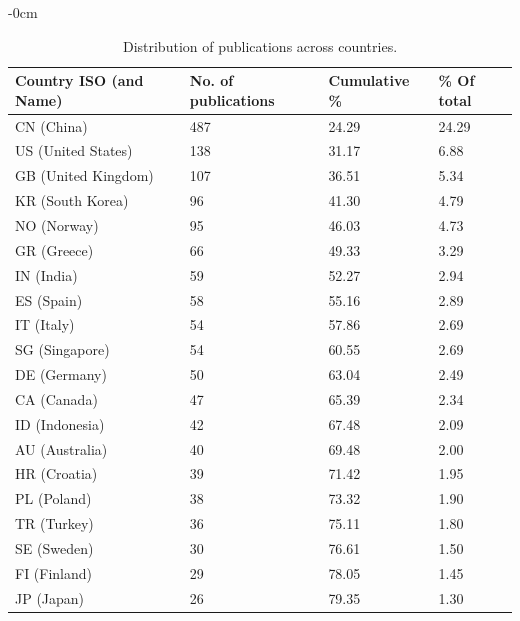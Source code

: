 \documentclass[jmse,review,submit,pdftex,moreauthors]{Definitions/mdpi}
\begin{document}
\begin{adjustwidth}{-\extralength}{0cm}
\begin{table}[H]
	\centering
	\caption{Distribution of publications across countries. }
	\begin{tabularx}{\linewidth}{XXXX}
		\hline
		Country ISO (and Name) & No. of publications & Cumulative \% & \% Of total \\
		\hline
		CN (China) & 487 & 24.29 & 24.29\\
		US (United States) & 138 & 31.17 & 6.88\\
		GB (United Kingdom) & 107 & 36.51 & 5.34\\
		KR (South Korea) & 96 & 41.30 & 4.79\\
		NO (Norway) & 95 & 46.03 & 4.73\\
		GR (Greece) & 66 & 49.33 & 3.29\\
		IN (India) & 59 & 52.27 & 2.94\\
		ES (Spain) & 58 & 55.16 & 2.89\\
		IT (Italy) & 54 & 57.86 & 2.69\\
		SG (Singapore) & 54 & 60.55 & 2.69\\
		DE (Germany) & 50 & 63.04 & 2.49\\
		CA (Canada) & 47 & 65.39 & 2.34\\
		ID (Indonesia) & 42 & 67.48 & 2.09\\
		AU (Australia) & 40 & 69.48 & 2.00\\
		HR (Croatia) & 39 & 71.42 & 1.95\\
		PL (Poland) & 38 & 73.32 & 1.90\\
		TR (Turkey) & 36 & 75.11 & 1.80\\
		SE (Sweden) & 30 & 76.61 & 1.50\\
		FI (Finland) & 29 & 78.05 & 1.45\\
		JP (Japan) & 26 & 79.35 & 1.30\\
		\hline
	\end{tabularx}
	\label{tab:resdesccountry}
\end{table}


\end{adjustwidth}
\end{document}
